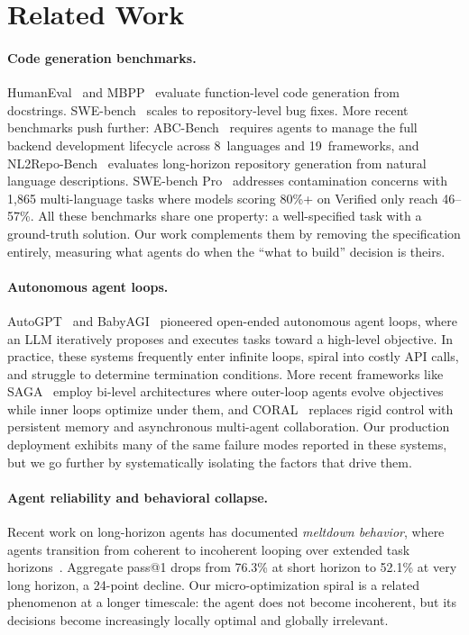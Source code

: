 \documentclass{article}
\begin{document}
\section{Related Work}
\label{sec:related}

\paragraph{Code generation benchmarks.}
HumanEval~\citep{chen2021codex} and MBPP~\citep{austin2021mbpp}
evaluate function-level code generation from docstrings.
SWE-bench~\citep{jimenez2024swebench} scales to repository-level
bug fixes. More recent benchmarks push further:
ABC-Bench~\citep{zhang2026abcbench} requires agents to manage the
full backend development lifecycle across 8~languages and
19~frameworks, and NL2Repo-Bench~\citep{nl2repobench2025} evaluates
long-horizon repository generation from natural language
descriptions. SWE-bench Pro~\citep{swebenchpro2026} addresses
contamination concerns with 1,865 multi-language tasks where
models scoring 80\%+ on Verified only reach 46--57\%.
All these benchmarks share one property: a well-specified task
with a ground-truth solution. Our work complements them by
removing the specification entirely, measuring what agents do when
the ``what to build'' decision is theirs.

\paragraph{Autonomous agent loops.}
AutoGPT~\citep{significantgravitas2023autogpt} and
BabyAGI~\citep{nakajima2023babyagi} pioneered open-ended
autonomous agent loops, where an LLM iteratively proposes and
executes tasks toward a high-level objective. In practice, these
systems frequently enter infinite loops, spiral into costly API
calls, and struggle to determine termination conditions.
More recent frameworks like SAGA~\citep{saga2025goalevolving}
employ bi-level architectures where outer-loop agents evolve
objectives while inner loops optimize under them, and
CORAL~\citep{coral2026multiagent} replaces rigid control with
persistent memory and asynchronous multi-agent collaboration.
Our production deployment exhibits many of the same failure modes
reported in these systems, but we go further by systematically
isolating the factors that drive them.

\paragraph{Agent reliability and behavioral collapse.}
Recent work on long-horizon agents has documented
\emph{meltdown behavior}, where agents transition from coherent
to incoherent looping over extended task
horizons~\citep{beyondpass2026}. Aggregate pass@1 drops from
76.3\% at short horizon to 52.1\% at very long horizon, a
24-point decline. Our micro-optimization spiral is a related
phenomenon at a longer timescale: the agent does not become
incoherent, but its decisions become increasingly locally optimal
and globally irrelevant.
\end{document}
